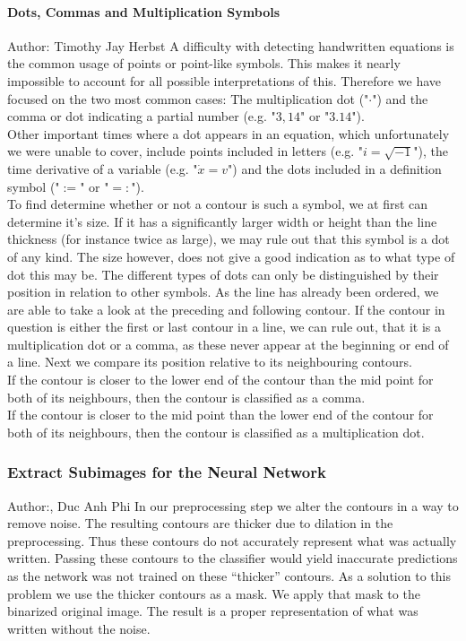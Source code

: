\documentclass[12pt]{article}
\begin{document}
	\paragraph{Dots, Commas and Multiplication Symbols}
	\small{Author: Timothy Jay Herbst} \newline \newline
	A difficulty with detecting handwritten equations is the common usage of points or point-like symbols.
	This makes it nearly impossible to account for all possible interpretations of this.
	Therefore we have focused on the two most common cases:
	The multiplication dot ("$\cdot$") and the comma or dot indicating a partial number (e.g. "$3,14$" or "$3.14$").\\
	Other important times where a dot appears in an equation, which unfortunately we were unable to cover, include points included in letters (e.g. "$i=\sqrt{-1}$"), the time derivative of a variable (e.g. "$\dot{x}=v$") and the dots included in a definition symbol ("$:=$" or "$=:$").\\  %
	To find determine whether or not a contour is such a symbol, we at first can determine it's size.
	If it has a significantly larger width or height than the line thickness (for instance twice as large), we may rule out that this symbol is a dot of any kind.
	The size however, does not give a good indication as to what type of dot this may be.
	The different types of dots can only be distinguished by their position in relation to other symbols.
	As the line has already been ordered, we are able to take a look at the preceding and following contour.
	If the contour in question is either the first or last contour in a line, we can rule out, that it is a multiplication dot or a comma, as these never appear at the beginning or end of a line.
	Next we compare its position relative to its neighbouring contours.\\
	If the contour is closer to the lower end of the contour than the mid point for both of its neighbours, then the contour is classified as a comma.\\
	
	If the contour is closer to the mid point than the lower end of the contour for both of its neighbours, then the contour is classified as a multiplication dot.\\

\subsubsection{Extract Subimages for the Neural Network}
\small{Author:, Duc Anh Phi} \newline \newline
In our preprocessing step we alter the contours in a way to remove noise. The resulting contours are thicker due to dilation in the preprocessing. Thus these contours do not accurately represent what was actually written. Passing these contours to the classifier would yield inaccurate predictions as the network was not trained on these “thicker” contours.
As a solution to this problem we use the thicker contours as a mask. We apply that mask to the binarized original image. The result is a proper representation of what was written without the noise.
\end{document}
